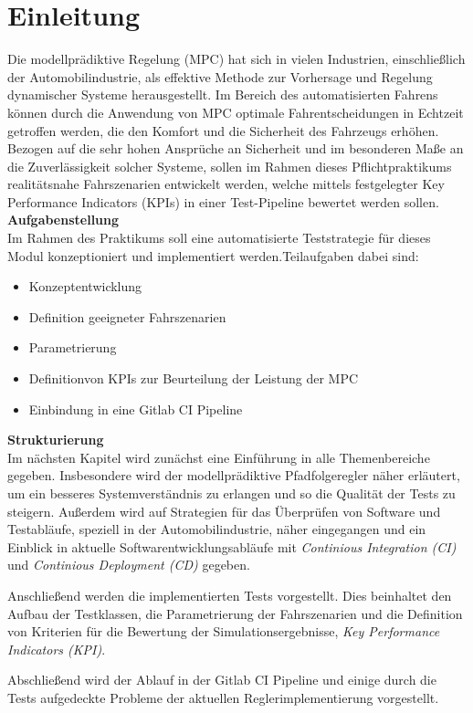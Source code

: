 \chapter{Einleitung} \label{chap:Einleitung}
\thispagestyle{empty}
Die modellprädiktive Regelung (MPC) hat sich in vielen Industrien, einschließlich der Automobilindustrie, als effektive Methode zur Vorhersage und Regelung dynamischer Systeme herausgestellt. Im Bereich des automatisierten Fahrens können durch die Anwendung von MPC optimale Fahrentscheidungen in Echtzeit getroffen werden, die den Komfort und die Sicherheit des Fahrzeugs erhöhen. Bezogen auf die sehr hohen Ansprüche an Sicherheit und im besonderen Maße an die Zuverlässigkeit solcher Systeme, sollen im Rahmen dieses Pflichtpraktikums realitätsnahe Fahrszenarien entwickelt werden, welche mittels festgelegter Key Performance Indicators (KPIs) in einer Test-Pipeline bewertet werden sollen.\\

\noindent\textbf{Aufgabenstellung}\\
\noindent Im Rahmen des Praktikums soll eine automatisierte Teststrategie für dieses Modul konzeptioniert und implementiert werden.Teilaufgaben dabei sind:
\begin{itemize}
    \item Konzeptentwicklung
    \item Definition geeigneter Fahrszenarien
    \item Parametrierung
    \item Definitionvon KPIs zur Beurteilung der Leistung der MPC
    \item Einbindung in eine Gitlab CI Pipeline
\end{itemize}

\noindent\textbf{Strukturierung}\\
\noindent Im nächsten Kapitel wird zunächst eine Einführung in alle Themenbereiche gegeben. Insbesondere wird der modellprädiktive Pfadfolgeregler näher erläutert, um ein besseres Systemverständnis zu erlangen und so die Qualität der Tests zu steigern. Außerdem wird auf  Strategien für das Überprüfen von Software und Testabläufe, speziell in der Automobilindustrie, näher eingegangen und ein Einblick in aktuelle Softwarentwicklungsabläufe mit \textit{Continious Integration (CI)} und \textit{Continious Deployment (CD)} gegeben.

Anschließend werden die implementierten Tests vorgestellt. Dies beinhaltet den Aufbau der Testklassen, die Parametrierung der Fahrszenarien und die Definition von Kriterien für die Bewertung der Simulationsergebnisse, \textit{Key Performance Indicators (KPI)}.

Abschließend wird der Ablauf in der Gitlab CI Pipeline und einige durch die Tests aufgedeckte Probleme der aktuellen Reglerimplementierung vorgestellt.
